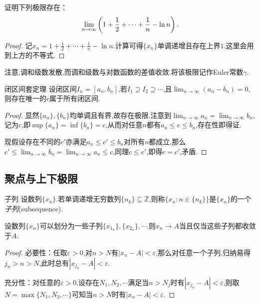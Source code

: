 \begin{example}
	证明下列极限存在：$$\lim_{n\to \infty} \left(  1+\frac{1}{2}+\cdots + \frac{1}{n}-\ln n  \right).$$
\end{example}
\begin{proof}
	记$x_n=1+\frac{1}{2}+\cdots + \frac{1}{n}-\ln n$.计算可得$\{ x_n \}$单调递增且存在上界$1$.这里会用到上方的不等式.
\end{proof}

注意,调和级数发散,而调和级数与对数函数的差值收敛.将该极限记作Euler常数$\gamma$.

\begin{theorem}{闭区间套定理}
	设闭区间$I_n=[a_n,b_n]$,若$I_1 \supseteq I_2 \supseteq \cdots $,且$\lim_{n\to \infty} (a_n-b_n)=0$,则存在唯一的$c$属于所有闭区间.
\end{theorem}
\begin{proof}
	显然$\{ a_n \},\{ b_n \}$均单调且有界,故存在极限.注意到$\lim_{n\to \infty} a_n = \lim_{n\to \infty} b_n$,记为$c$,即$\sup \{ a_n \} = \inf \{ b_n \} = c$,从而对任意$n$都有$a_n \leq c \leq b_n$,存在性即得证.
	
	现假设存在不同的$c'$亦满足$a_n \leq c' \leq b_n$对所有$n$都成立,那么$c' \leq \lim_{n\to \infty} b_n = \lim_{n\to \infty} a_n \leq c$,同理$c \leq c'$,即得$c=c'$,矛盾.
\end{proof}

\subsection{聚点与上下极限}

\begin{definition}{子列}
	设数列$\{ x_n \}$.若单调递增无穷数列$\{ n_k \} \subseteq \mathbb{Z}$,则称$\{ x_n:n \in  \{ n_k \} \}$是$\{ x_n \}$的一个\textit{子列}(subsequence).
\end{definition}

\begin{proposition}{}
	设数列$\{ x_n \}$可以划分为一些子列$\{ x_{1_n} \},\{ x_{2_n} \},\cdots$.则$x_n \to A$当且仅当这些子列都收敛于$A$.
\end{proposition}
\begin{proof}
	必要性：任取$\varepsilon >0$,对$n>N$有$|x_n-A|<\varepsilon$,那么对任意一个子列,归纳易得$j_n>n>N$,此时总有$|x_{j_n}-A|<\varepsilon$.
	
	充分性：对任意的$\varepsilon >0$,设存在$N_1,N_2,\cdots$满足当$n>N_j$时有$|x_{j_n}-A|<\varepsilon$,则取$N=\max \{ N_1,N_2,\cdots \}$可知当$n>N$时有$|x_n-A|<\varepsilon$.
\end{proof}


